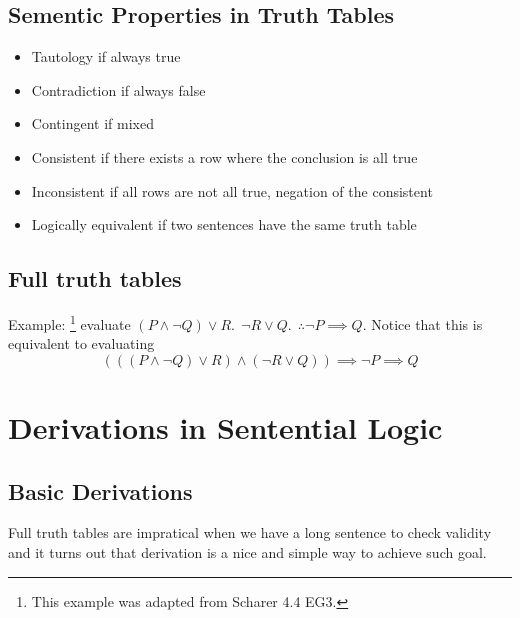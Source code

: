 \documentclass[10pt]{article}
\begin{document}
\subsection{Sementic Properties in Truth Tables}
\begin{itemize}
    \item Tautology if always true
    \item Contradiction if always false 
    \item Contingent if mixed
    \item Consistent if there exists a row where the conclusion is all true
    \item Inconsistent if all rows are not all true, negation of the consistent
    \item Logically equivalent if two sentences have the same truth table
\end{itemize}



\subsection{Full truth tables}
Example: \footnote{This example was adapted from Scharer 4.4 EG3.}
evaluate $(P\land \neg Q)\vee R. ~~\neg R\vee Q. ~~\therefore \neg P\implies Q$. 
Notice that this is equivalent to evaluating
\begin{equation*}
    \left(\left(\left(P\land \neg Q\right)\vee R \right) \land 
    \left(\neg R\vee Q\right)\right) \implies \neg P\implies Q
\end{equation*}



\section{Derivations in Sentential Logic}
\subsection{Basic Derivations}
Full truth tables are impratical when we have a long sentence to check validity 
and it turns out that derivation is a nice and simple way to achieve such goal.
\end{document}
